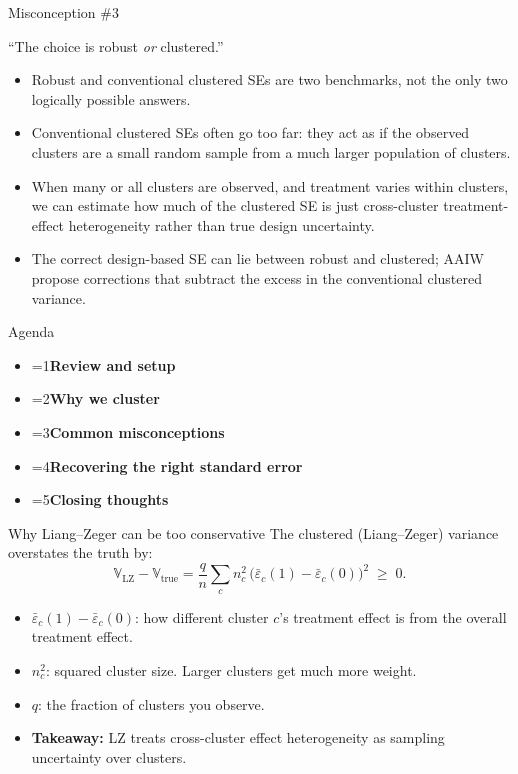 \documentclass[11pt,aspectratio=169]{beamer}
\newcommand{\bx}[1]{\textbf{#1}}
\newcounter{agcur}
\newcommand{\agitem}[2]{\item {\ifnum\value{agcur}=#1\bfseries\fi #2}}
\newcommand{\agenda}[1]{%
  \setcounter{agcur}{#1}%
  \begin{frame}{Agenda}
    \vspace{0.6em}
    \large
    \begin{itemize}\setlength{\itemsep}{11pt}
      \agitem{1}{Review and setup}
      \agitem{2}{Why we cluster}
      \agitem{3}{Common misconceptions}
      \agitem{4}{Recovering the right standard error}
      \agitem{5}{Closing thoughts}
    \end{itemize}
  \end{frame}}
\begin{document}
\begin{frame}{Misconception \#3}
\begin{block}{\normalsize ``The choice is robust \emph{or} clustered.''}
\end{block}

\begin{itemize}\setlength{\itemsep}{9pt}
\item Robust and conventional clustered SEs are two benchmarks, not the only two
logically possible answers.

\item Conventional clustered SEs often go too far: they act as if the observed clusters are a small random sample from a much larger population of clusters.

\item When many or all clusters are observed, and treatment varies within clusters, we can estimate how much of the clustered SE is just cross-cluster treatment-effect heterogeneity rather than true design uncertainty.

\item The correct design-based SE can lie between robust and clustered; AAIW propose corrections that subtract the excess in the conventional clustered variance.
\end{itemize}
\end{frame}

\agenda{4}

\begin{frame}{Why Liang--Zeger can be too conservative}
The clustered (Liang--Zeger) variance overstates the truth by:
\[
  \mathbb{V}_{\mathrm{LZ}} - \mathbb{V}_{\text{true}}
  = \frac{q}{n}\sum_{c} n_c^2\,\big(\bar\varepsilon_c(1)-\bar\varepsilon_c(0)\big)^2 \;\ge\; 0.
\]
\begin{itemize}\setlength{\itemsep}{7pt}
  \item $\bar\varepsilon_c(1)-\bar\varepsilon_c(0)$: how different cluster $c$'s treatment effect is from the overall treatment effect.
  \item $n_c^2$: squared cluster size. Larger clusters get much more weight.
  \item $q$: the fraction of clusters you observe.
  \item \bx{Takeaway:} LZ treats cross-cluster effect heterogeneity as sampling uncertainty over clusters.
\end{itemize}
\end{frame}
\end{document}

